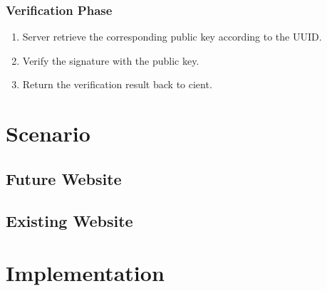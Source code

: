 \begin{CJK}{Bg5}{bsmi}
\subsubsection{Verification Phase}

\begin{enumerate}
\item Server retrieve the corresponding public key according to the UUID.
\item Verify the signature with the public key.
\item Return the verification result back to cient.
\end{enumerate}

\section{Scenario}

\subsection{Future Website}

\subsection{Existing Website}

\section{Implementation}

\end{CJK}